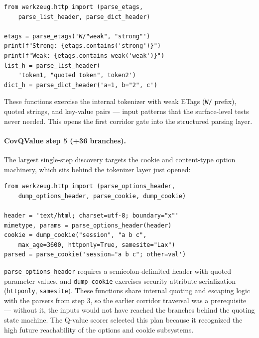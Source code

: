 \begin{small}
\begin{verbatim}
from werkzeug.http import (parse_etags,
    parse_list_header, parse_dict_header)

etags = parse_etags('W/"weak", "strong"')
print(f"Strong: {etags.contains('strong')}")
print(f"Weak: {etags.contains_weak('weak')}")
list_h = parse_list_header(
    'token1, "quoted token", token2')
dict_h = parse_dict_header('a=1, b="2", c')
\end{verbatim}
\end{small}

These functions exercise the internal tokenizer with weak ETags (\texttt{W/} prefix), quoted strings, and key-value pairs --- input patterns that the surface-level tests never needed. This opens the first corridor gate into the structured parsing layer.

\paragraph{CovQValue step 5 (+36 branches).} The largest single-step discovery targets the cookie and content-type option machinery, which sits behind the tokenizer layer just opened:

\begin{small}
\begin{verbatim}
from werkzeug.http import (parse_options_header,
    dump_options_header, parse_cookie, dump_cookie)

header = 'text/html; charset=utf-8; boundary="x"'
mimetype, params = parse_options_header(header)
cookie = dump_cookie("session", "a b c",
    max_age=3600, httponly=True, samesite="Lax")
parsed = parse_cookie('session="a b c"; other=val')
\end{verbatim}
\end{small}

\texttt{parse\_options\_header} requires a semicolon-delimited header with quoted parameter values, and \texttt{dump\_cookie} exercises security attribute serialization (\texttt{httponly}, \texttt{samesite}). These functions share internal quoting and escaping logic with the parsers from step 3, so the earlier corridor traversal was a prerequisite --- without it, the inputs would not have reached the branches behind the quoting state machine. The Q-value scorer selected this plan because it recognized the high future reachability of the options and cookie subsystems.
